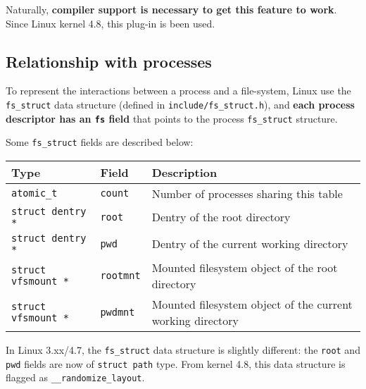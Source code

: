 \documentclass[10pt,a4paper]{article}
\begin{document}
Naturally, \textbf{compiler support is necessary to get this feature to work}. Since Linux kernel 4.8, this plug-in is been used.


\subsection{Relationship with processes}

To represent the interactions between a process and a file-system, Linux use the \texttt{fs\_struct} data structure (defined in \texttt{include/fs\_struct.h}), and \textbf{each process descriptor has an \texttt{fs} field} that points to the process \texttt{fs\_struct} structure. 

Some \texttt{fs\_struct} fields are described below:

\begin{center}
\begin{tabular}{l|l|p{13cm}} 

\toprule
Type & Field & Description \\
\midrule

\texttt{atomic\_t} & \texttt{count} & Number of processes sharing this table

\\

\texttt{struct dentry *} & \texttt{root} & Dentry of the root directory

\\

\texttt{struct dentry *} & \texttt{pwd} & Dentry of the current working directory

\\

\texttt{struct vfsmount *} & \texttt{rootmnt} & Mounted filesystem object of the root directory

\\

\texttt{struct vfsmount *} & \texttt{pwdmnt} & Mounted filesystem object of the current working directory

\\
 
\bottomrule
\end{tabular}
\end{center}

In Linux 3.xx/4.7, the \texttt{fs\_struct} data structure is slightly different: the \texttt{root} and \texttt{pwd} fields are now of \texttt{struct path} type. From kernel 4.8, this data structure is flagged as \texttt{\_\_randomize\_layout}.
\end{document}
